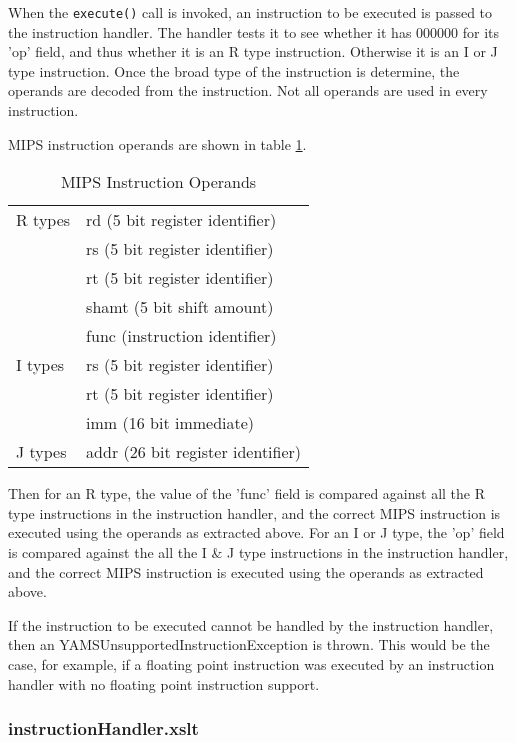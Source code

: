 When the \verb"execute()" call is invoked, an instruction to be executed is passed to the instruction handler. The handler tests it to see whether it has 000000 for its 'op' field, and thus whether it is an R type instruction. Otherwise it is an I or J type instruction.
Once the broad type of the instruction is determine, the operands are decoded from the instruction.
Not all operands are used in every instruction.

MIPS instruction operands are shown in table \ref{tab:InstrOps}.

\begin{table}
\begin{center}
	\begin{tabular}{|l|l|}
	\hline
	R types	&	rd (5 bit register identifier) \\
			&	rs (5 bit register identifier) \\
			&	rt (5 bit register identifier) \\
			&	shamt (5 bit shift amount) \\
			&	func (instruction identifier) \\
	I types	&	rs (5 bit register identifier) \\
			&	rt (5 bit register identifier) \\
			&	imm (16 bit immediate) \\
	J types	&	addr (26 bit register identifier) \\
	\hline
	\end{tabular}
\caption{MIPS Instruction Operands}
\label{tab:InstrOps}
\end{center}
\end{table}
		
Then for an R type, the value of the 'func' field is compared against all the R type instructions in the instruction handler, and the correct MIPS instruction is executed using the operands as extracted above.
For an I or J type, the 'op' field is compared against the all the I \& J type instructions in the instruction handler, and the correct MIPS instruction is executed using the operands as extracted above.

If the instruction to be executed cannot be handled by the instruction handler, then an YAMSUnsupportedInstructionException is thrown. This would be the case, for example, if a floating point instruction was executed by an instruction handler with no floating point instruction support.

\subsubsection{instructionHandler.xslt}

